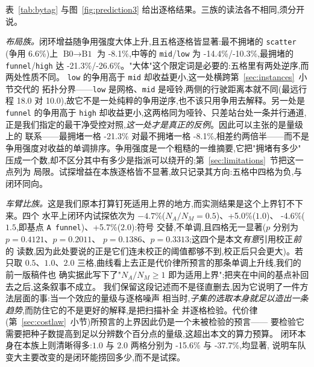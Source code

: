 \documentclass[manuscript,screen,review]{acmart}
\newcommand{\GainProbeStarve}{4.7\%}     %
\newcommand{\GainProbeFleetBase}{-4.6\%} %
\newcommand{\GainProbeFleetOne}{+5.0\%}  %
\newcommand{\GainProbeFleetTwo}{+5.7\%}  %
\newcommand{\GainLoopFunnel}{-21.3\%}    %
\newcommand{\GainLoopHigh}{-26.6\%}      %
\newcommand{\GainLoopMid}{-14.4\%}       %
\newcommand{\GainLoopLow}{-10.3\%}       %
\newcommand{\GainLoopScatter}{-8.1\%}    %
\newcommand{\GainLoopFleetOne}{-15.6\%}  %
\newcommand{\GainLoopFleetTwo}{-37.7\%}  %
\newcommand{\PProbeFleetHalfRaw}{=0.4121}
\newcommand{\PProbeFleetOneRaw}{=0.2011}
\newcommand{\PProbeFleetBaseRaw}{=0.1386}
\newcommand{\PProbeFleetTwoRaw}{=0.3313}
\newcommand{\ContentionLo}{6.6\%}
\newcommand{\LegDumbbell}{10.0}          %
\newcommand{\LegGrid}{18.0}              %
\begin{document}
表~\ref{tab:bytag} 与图~\ref{fig:prediction3} 给出逐格结果。三族的读法各不相同,须分开说。

\emph{布局族。}闭环增益随争用强度大体上升,且五格逐格皆显著:最不拥堵的 \texttt{scatter}
(争用 \ContentionLo{})上 $\text{B0}\to\text{B1}$ 为 \GainLoopScatter{},中等的
\texttt{mid}/\texttt{low} 为 \GainLoopMid{}/\GainLoopLow{},最拥堵的
\texttt{funnel}/\texttt{high} 达
\GainLoopFunnel{}/\GainLoopHigh{}。"大体"这个限定词是必要的:五格里有两处逆序,而两处性质不同。
\texttt{low} 的争用高于 \texttt{mid} 却收益更小,这一处横跨第~\ref{sec:instances}~小节交代的
拓扑分界——\texttt{low} 是网格、\texttt{mid} 是哑铃,两侧的行驶距离本就不同(最远行程
\LegGrid{} 对 \LegDumbbell{}),故它不是一处纯粹的争用逆序,也不该只用争用去解释。另一处是
\texttt{funnel} 的争用高于 \texttt{high} 却收益更小,这两格同为哑铃、只差站台处一条并行通道,
正是我们指定的最干净受控对照,\emph{这一处才是真正的反例}。因此可以主张的是量级上的
联系——最拥堵一格 \GainLoopFunnel{} 对最不拥堵一格 \GainLoopScatter{},相差约两倍半——而不是
争用强度对收益的单调排序。争用强度是一个粗糙的一维摘要,它把"拥堵有多少"
压成一个数,却不区分其中有多少是指派可以绕开的;第~\ref{sec:limitations}~节把这一点列为
局限。试探增益在本族逐格皆不显著,故只记录其方向:五格中四格为负,与闭环同向。

\emph{车臂比族。}这是我们原本打算钉死适用上界的地方,而实测结果是这个上界钉不下来。四个
水平上闭环内试探依次为 $-\GainProbeStarve$($N_A/N_M=0.5$)、\GainProbeFleetOne{}($1.0$)、
\GainProbeFleetBase{}($1.5$,即基点 \texttt{A funnel})、\GainProbeFleetTwo{}($2.0$):符号
交替,不单调,且四格无一显著($p$ 分别为 $p\PProbeFleetHalfRaw$、$p\PProbeFleetOneRaw$、
$p\PProbeFleetBaseRaw$、$p\PProbeFleetTwoRaw$;这四个是本文\emph{有意}引用校正\emph{前}的
读数,因为此处要说的正是它们连未校正的阈值都够不到,校正后只会更大)。若只取
$0.5$、$1.0$、$2.0$ 三格,曲线看上去正是代价律所预言的那条单调上升线,我们的前一版稿件也
确实据此写下了"$N_A/N_M\ge 1$ 即为适用上界";把夹在中间的基点补回去之后,这条叙事不成立。
我们保留这段记述而不是径直删去,因为它说明了一件方法层面的事:当一个效应的量级与逐格噪声
相当时,\emph{子集的选取本身就足以造出一条趋势},而防住它的不是更好的解释,是把扫描补全
并逐格检验。代价律(第~\ref{sec:costlaw}~小节)所预言的上界因此仍是一个未被检验的预言——
要检验它需要把种子数提高到足以分辨数个百分点的量级,这超出本文的算力预算。
闭环本身在本族上则清晰得多:$1.0$ 与 $2.0$ 两格分别为 \GainLoopFleetOne{} 与
\GainLoopFleetTwo{},均显著,
说明车队变大主要改变的是闭环能捞回多少,而不是试探。
\end{document}
